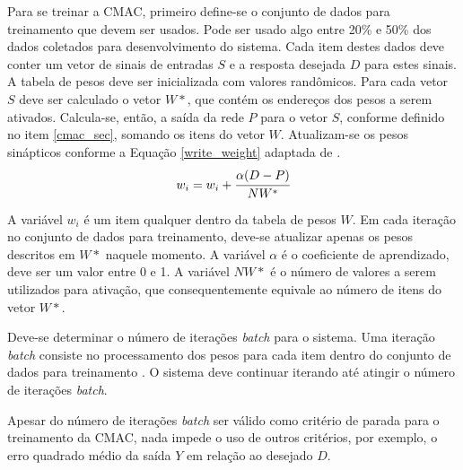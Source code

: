 Para se treinar a CMAC, primeiro define-se o conjunto de dados para treinamento que devem ser usados. 
Pode ser usado algo entre 20\% e 50\% dos dados coletados para desenvolvimento do sistema. 
Cada item destes dados deve conter um vetor de sinais de entradas $S$ e a resposta desejada $D$ para estes sinais. 
A tabela de pesos deve ser inicializada com valores randômicos. 
Para cada vetor $S$ deve ser calculado o vetor $W*$, que contém os endereços dos pesos a serem ativados. 
Calcula-se, então, a saída da rede $P$ para o vetor $S$, conforme definido no item \ref{cmac_sec}, somando os itens do vetor $W$. 
Atualizam-se os pesos sinápticos conforme a Equação \ref{write_weight} adaptada de .
\begin{equation}
	\label{write_weight}
	w_{i} = w_{i} + \cfrac{\alpha (D - P)}{NW^{*}}
\end{equation}

A variável $w_{i}$ é um item qualquer dentro da tabela de pesos $W$. 
Em cada iteração no conjunto de dados para treinamento, deve-se atualizar apenas os pesos descritos em $W*$ naquele momento. 
A variável $\alpha$ é o coeficiente de aprendizado, deve ser um valor entre 0 e 1. 
A variável $NW*$ é o número de valores a serem utilizados para ativação, que consequentemente equivale ao número de itens do vetor $W*$.

Deve-se determinar o número de iterações \emph{batch} para o sistema. 
Uma iteração \emph{batch} consiste no processamento dos pesos para cada item dentro do conjunto de dados para treinamento \cite{Ng2015}. 
O sistema deve continuar iterando até atingir o número de iterações \emph{batch}.

Apesar do número de iterações \emph{batch} ser válido como critério de parada para o treinamento da CMAC, nada impede o uso de outros critérios, por exemplo, o erro quadrado médio da saída $Y$ em relação ao desejado $D$.
